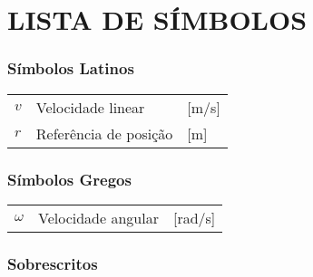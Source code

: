 




\chapter*{LISTA DE SÍMBOLOS}




\subsection*{Símbolos Latinos}

\begin{tabular}{p{}p{}>{\PreserveBacklash\raggedleft}p{}}
$v$  & Velocidade linear  & {[}m/s{]}\tabularnewline
$r$ & Referência de posição & {[}m{]}\tabularnewline
\end{tabular}


\subsection*{Símbolos Gregos}

\begin{tabular}{p{}p{}>{\PreserveBacklash\raggedleft}p{}}
$\omega$ & Velocidade angular & {[}rad/s{]}\tabularnewline
\end{tabular}
\begin{comment}


\subsection*{Subscritos}

\begin{tabular}{p{0.1\textwidth}p{0.8\textwidth}}
$ref$  & referência \tabularnewline
$fer$  & ferramenta \tabularnewline
$sis$  & sistema \tabularnewline
$des$ & desejado\tabularnewline
\end{tabular}

\end{comment}
\subsection*{Sobrescritos}

